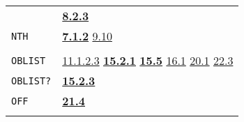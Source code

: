 \documentclass[a4paper]{scrbook}
\begin{document}
\begin{longtable}[]{@{}ll@{}}
\begin{minipage}[t]{0.24\columnwidth}
\end{minipage} & \begin{minipage}[t]{0.70\columnwidth}\raggedright\strut
\textbf{\href{08-truth.md\#823-boolean-operators-1}{8.2.3}}\strut
\end{minipage}\tabularnewline
\begin{minipage}[t]{0.24\columnwidth}\raggedright\strut
\texttt{NTH}\strut
\end{minipage} & \begin{minipage}[t]{0.70\columnwidth}\raggedright\strut
\textbf{\href{07-structured-objects.md\#712-nth-1}{7.1.2}} \href{09-functions.md\#910-apply-1}{9.10}\strut
\end{minipage}\tabularnewline
\begin{minipage}[t]{0.24\columnwidth}\raggedright\strut
\strut
\end{minipage} & \begin{minipage}[t]{0.70\columnwidth}\raggedright\strut
\strut
\end{minipage}\tabularnewline
\begin{minipage}[t]{0.24\columnwidth}\raggedright\strut
\texttt{OBLIST}\strut
\end{minipage} & \begin{minipage}[t]{0.70\columnwidth}\raggedright\strut
\href{11-input-output.md\#11123-princ}{11.1.2.3} \textbf{\href{15-lexical-blocking.md\#1521-oblist-names}{15.2.1}}
\textbf{\href{15-lexical-blocking.md\#155-initial-state}{15.5}} \href{16-errors-frames-etc.md\#161-listen}{16.1}
\href{20-coroutines.md\#201-process-the-type}{20.1} \href{22-storage-management.md\#223-other-storage}{22.3}\strut
\end{minipage}\tabularnewline
\begin{minipage}[t]{0.24\columnwidth}\raggedright\strut
\texttt{OBLIST?}\strut
\end{minipage} & \begin{minipage}[t]{0.70\columnwidth}\raggedright\strut
\textbf{\href{15-lexical-blocking.md\#1523-oblist}{15.2.3}}\strut
\end{minipage}\tabularnewline
\begin{minipage}[t]{0.24\columnwidth}\raggedright\strut
\texttt{OFF}\strut
\end{minipage} & \begin{minipage}[t]{0.70\columnwidth}\raggedright\strut
\textbf{\href{21-interrupts.md\#214-off}{21.4}}\strut
\end{minipage}\tabularnewline
\begin{minipage}[t]{0.24\columnwidth}\raggedright\strut

\end{minipage}
\end{longtable}
\end{document}
